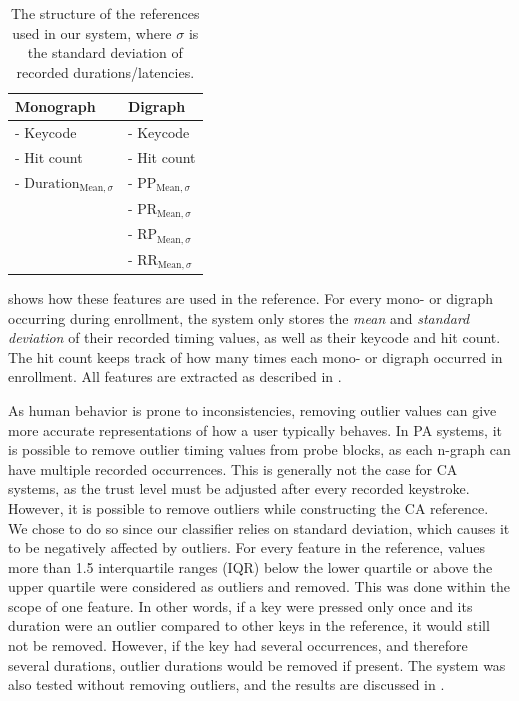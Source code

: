 \begin{table}[h]
\centering
\begin{tabular}{|l|l|}
\hline
Monograph & Digraph\\ \hline
- Keycode & - Keycode\\
- Hit count & - Hit count\\
- $\text{Duration}_{\text{Mean}, \sigma} $& - $\text{PP}_{\text{Mean}, \sigma}$\\
& - $\text{PR}_{\text{Mean}, \sigma}$  \\
& - $\text{RP}_{\text{Mean}, \sigma}$ \\
& - $\text{RR}_{\text{Mean}, \sigma}$
\\ \hline
\end{tabular}

\caption{The structure of the references used in our system, where $\sigma$ is the standard deviation of recorded durations/latencies.}
\label{tab:CA-reference-structure}
\end{table}
 shows how these features are used in the reference.
For every mono- or digraph occurring during enrollment, the system only stores the \textit{mean} and \textit{standard deviation} of their recorded timing values, as well as their keycode and hit count.
The hit count keeps track of how many times each mono- or digraph occurred in enrollment.
All features are extracted as described in .

As human behavior is prone to inconsistencies, removing outlier values can give more accurate representations of how a user typically behaves.
In PA systems, it is possible to remove outlier timing values from probe blocks, as each n-graph can have multiple recorded occurrences.
This is generally not the case for CA systems, as the trust level must be adjusted after every recorded keystroke.
However, it is possible to remove outliers while constructing the CA reference.
We chose to do so since our classifier relies on standard deviation, which causes it to be negatively affected by outliers.
For every feature in the reference, values more than 1.5 interquartile ranges (IQR) below the lower quartile or above the upper quartile were considered as outliers and removed.
This was done within the scope of one feature. 
In other words, if a key were pressed only once and its duration were an outlier compared to other keys in the reference, it would still not be removed.
However, if the key had several occurrences, and therefore several durations, outlier durations would be removed if present.
The system was also tested without removing outliers, and the results are discussed in .


